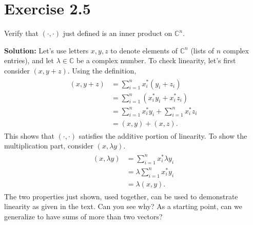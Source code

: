 \documentclass{book}
\begin{document}
\section*{Exercise 2.5}
    Verify that $(\cdot,\cdot)$ just defined is an inner product on $\mathbb{C}^n$.
    
    \textbf{Solution:} Let's use letters $x, y, z$ to denote elements of $\mathbb{C}^n$ (lists of $n$ complex entries), and let $\lambda \in \mathbb{C}$ be a complex number. To check linearity, let's first consider $(x, y+z)$. Using the definition,
    \begin{align}
    \begin{aligned}
        (x, y+z) &= \sum_{i=1}^n x_i^* (y_i + z_i) \\
        &= \sum_{i=1}^n (x_i^* y_i + x_i^* z_i) \\
        &= \sum_{i=1}^n x_i^* y_i + \sum_{i=1}^n x_i^* z_i \\
        &= (x, y) + (x,z).
    \end{aligned}
    \end{align}
    This shows that $(\cdot, \cdot)$ satisfies the additive portion of linearity. To show the multiplication part, consider $(x, \lambda y)$.
    \begin{align}
    \begin{aligned}
        (x, \lambda y) &= \sum_{i=1}^n x_i^* \lambda y_i \\
        &= \lambda \sum_{i=1}^n x_i^* y_i \\
        &= \lambda (x,y).
    \end{aligned}
    \end{align}
    The two properties just shown, used together, can be used to demonstrate linearity as given in the text. Can you see why? As a starting point, can we generalize to have sums of more than two vectors?
    
\end{document}
